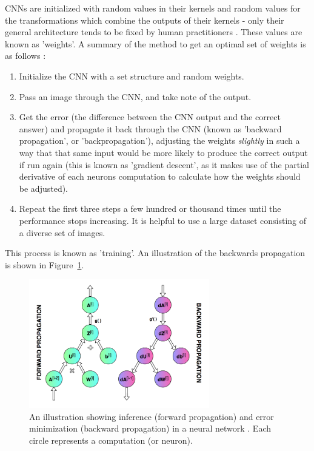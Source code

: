 CNNs are initialized with random values in their kernels and random values for the transformations which combine the outputs of their kernels - only their general architecture tends to be fixed by human practitioners \cite{website:cs231n_CNNs}. These values are known as 'weights'. A summary of the method to get an optimal set of weights is as follows \cite{werbos1974beyond}:

\begin{enumerate}
\item Initialize the CNN with a set structure and random weights.
\item Pass an image through the CNN, and take note of the output.
\item Get the error (the difference between the CNN output and the correct answer) and propagate it back through the CNN (known as 'backward propagation', or 'backpropagation'), adjusting the weights \emph{slightly} in such a way that that same input would be more likely to produce the correct output if run again (this is known as 'gradient descent', as it makes use of the partial derivative of each neurons computation to calculate how the weights should be adjusted).
\item Repeat the first three steps a few hundred or thousand times until the performance stops increasing. It is helpful to use a large dataset consisting of a diverse set of images.
\end{enumerate}

This process is known as 'training'. An illustration of the backwards propagation is shown in Figure~\ref{fig:backprop_nn}.

\begin{figure}[h!]
  \centering
  \includegraphics[width=0.7\textwidth]{literature_review/backprop_nn}
  \caption{\label{fig:backprop_nn}An illustration showing inference (forward propagation) and error minimization (backward propagation) in a neural network \cite{website:backprop_img}. Each circle represents a computation (or neuron).}
\end{figure}

